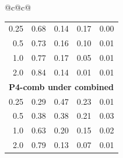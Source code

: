 \begin{tabular}{@{}c@{\hspace{1.5em}}c@{}}
\begin{tabular}[t]{rcccc}
0.25 & 0.68 & 0.14 & 0.17 & 0.00 \\
0.5 & 0.73 & 0.16 & 0.10 & 0.01 \\
1.0 & 0.77 & 0.17 & 0.05 & 0.01 \\
2.0 & 0.84 & 0.14 & 0.01 & 0.01 \\
\midrule
\multicolumn{5}{l}{\textbf{P4-comb under combined}} \\
0.25 & 0.29 & 0.47 & 0.23 & 0.01 \\
0.5 & 0.38 & 0.38 & 0.21 & 0.03 \\
1.0 & 0.63 & 0.20 & 0.15 & 0.02 \\
2.0 & 0.79 & 0.13 & 0.07 & 0.01 \\
\bottomrule
\end{tabular}
\end{tabular}

